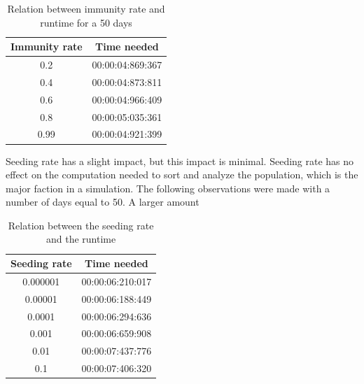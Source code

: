 \documentclass[runningheads]{llncs}
\begin{document}
\begin{table}
	\caption{Relation between immunity rate and runtime for a 50 days}
\begin{center}
	\begin{tabular}{ | c | c |}
		\hline
		Immunity rate & Time needed \\ \hline
		0.2 & 00:00:04:869:367 \\ \hline
		0.4 & 00:00:04:873:811 \\ \hline
		0.6 & 00:00:04:966:409 \\ \hline
		0.8 & 00:00:05:035:361 \\ \hline
		0.99 & 00:00:04:921:399 \\
		\hline	
	\end{tabular}
\end{center}
\end{table}
 
\noindent
Seeding rate has a slight impact, but this impact is minimal. Seeding rate has no effect on the computation needed to sort and analyze the population, which is the major faction in a simulation. The following observations were made with a number of days equal to 50. A larger amount 
\begin{table}
\caption{Relation between the seeding rate and the runtime}
\begin{center}
	\begin{tabular}{ | c | c |}
		\hline
		Seeding rate & Time needed \\ \hline
		0.000001 & 00:00:06:210:017 \\ \hline
		0.00001 & 00:00:06:188:449 \\ \hline
		0.0001 & 00:00:06:294:636 \\ \hline
		0.001 & 00:00:06:659:908 \\ \hline
		0.01 & 00:00:07:437:776 \\ \hline
		0.1 & 00:00:07:406:320 \\
		\hline	
	\end{tabular}
\end{center} 
\end{table} 
\noindent
\end{document}
